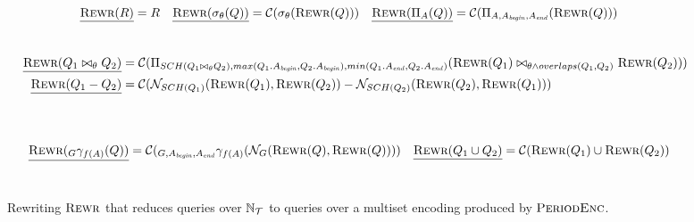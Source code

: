 \begin{figure*}[t]
  \centering
    \begin{align*}
\underline{\textsc{Rewr}(R)} & = R & \underline{\textsc{Rewr}(\sigma_\theta(Q))} &= \mathcal{C}(\sigma_\theta(\textsc{Rewr}(Q))) &
\underline{\textsc{Rewr}(\Pi_A(Q))} &= \mathcal{C}(\Pi_{A,A_\mathit{begin}, A_\mathit{end}}(\textsc{Rewr}(Q))) &
    \end{align*}\\[-6mm]
    \begin{align*}
    \underline{\textsc{Rewr}(Q_1 \bowtie_\theta Q_2)} &= \mathcal{C}(\Pi_{SCH(Q_1 \bowtie_{\theta} Q_2), max(Q_1.A_\mathit{begin}, Q_2.A_\mathit{begin}),min(Q_1.A_\mathit{end}, Q_2.A_\mathit{end})} (\textsc{Rewr}(Q_1) \bowtie_{\theta \wedge  overlaps(Q_1,Q_2)} \textsc{Rewr}(Q_2)))\\
      \underline{\textsc{Rewr}(Q_1 - Q_2)} &= \mathcal{C}(\mathcal{N}_{SCH(Q_1)}(\textsc{Rewr}(Q_1), \textsc{Rewr}(Q_2)) -  \mathcal{N}_{SCH(Q_2)}(\textsc{Rewr}(Q_2), \textsc{Rewr}(Q_1)))
    \end{align*}\\[-7mm]
\\[-7mm]
\begin{align*}
  \underline{\reprRewr(\aggregation{G}{f(A)}(\query))} &= \coalesceOp (\aggregation{G,\attrBegin, \attrEnd}{f(A)}(\normalizeOp_{G}(\reprRewr(\query), \reprRewr(\query))))
& %
 \underline{\reprRewr(\query_1 \union \query_2)} &= \coalesceOp(\reprRewr(\query_1) \union \reprRewr(\query_2))
    \end{align*}\\ %
  \caption{Rewriting $\textsc{Rewr}$ that reduces queries over ${{\mathbb{N}}}_{\mathcal{T}}$ to queries over a multiset encoding produced by $\textsc{PeriodEnc}$.}
  \label{fig:rewrite}
\end{figure*}


